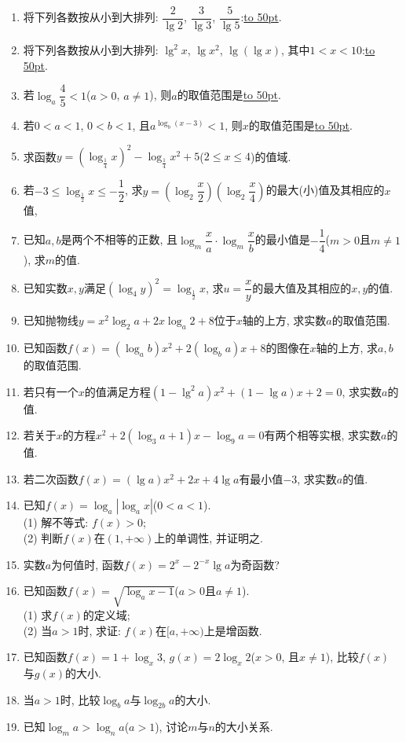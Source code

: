 \documentclass[10pt,a4paper]{article}
\newcommand{\blank}[1]{\underline{\hbox to #1pt{}}}
\begin{document}
\begin{enumerate}[1.]
\item 将下列各数按从小到大排列: $\dfrac 2{\lg 2}$, $\dfrac 3{\lg 3}$, $\dfrac 5{\lg 5}$:\blank{50}.
\item 将下列各数按从小到大排列: $\lg ^2x$, $\lg x^2$, $\lg (\lg x)$, 其中$1<x<10$:\blank{50}.
\item 若$\log_a\dfrac 45<1$($a>0$, $a\ne 1$), 则$a$的取值范围是\blank{50}.
\item 若$0<a<1$, $0<b<1$, 且$a^{\log_b(x-3)}<1$, 则$x$的取值范围是\blank{50}.
\item 求函数$y=(\log_{\frac 14}x)^2-\log_{\frac 14}x^2+5$($2\le x\le 4$)的值域.
\item 若$-3\le \log_{\frac 12}x\le -\dfrac 12$, 求$y=(\log_2\dfrac x2)(\log_2\dfrac x4)$的最大(小)值及其相应的$x$值,
\item 已知$a,b$是两个不相等的正数, 且$\log_m\dfrac xa\cdot \log_m\dfrac xb$的最小值是$-\dfrac 14$($m>0$且$m\ne 1$), 求$m$的值.
\item 已知实数$x,y$满足$(\log_4y)^2=\log_{\frac 12}x$, 求$u=\dfrac xy$的最大值及其相应的$x,y$的值.
\item 已知抛物线$y=x^2\log_2a+2x\log_a2+8$位于$x$轴的上方, 求实数$a$的取值范围.
\item 已知函数$f(x)=(\log_ab)x^2+2(\log_ba)x+8$的图像在$x$轴的上方, 求$a,b$的取值范围.
\item 若只有一个$x$的值满足方程$(1-\lg ^2a)x^2+(1-\lg a)x+2=0$, 求实数$a$的值.
\item 若关于$x$的方程$x^2+2(\log_3a+1)x-\log_9a=0$有两个相等实根, 求实数$a$的值.
\item 若二次函数$f(x)=(\lg a)x^2+2x+4\lg a$有最小值$-3$, 求实数$a$的值.
\item 已知$f(x)=\log_a|\log_ax|$($0<a<1$).\\
(1) 解不等式: $f(x)>0$;\\
(2) 判断$f(x)$在$(1,+\infty)$上的单调性, 并证明之.
\item 实数$a$为何值时, 函数$f(x)=2^x-2^{-x}\lg a$为奇函数?
\item 已知函数$f(x)=\sqrt {\log_ax-1}$($a>0$且$a\ne 1$).\\
(1) 求$f(x)$的定义域;\\
(2) 当$a>1$时, 求证: $f(x)$在$[a,+\infty)$上是增函数.
\item 已知函数$f(x)=1+\log_x3$, $g(x)=2\log_x2$($x>0$, 且$x\ne 1$), 比较$f(x)$与$g(x)$的大小.
\item 当$a>1$时, 比较$\log_ba$与$\log_{2b}a$的大小.
\item 已知$\log_ma>\log_na$($a>1$), 讨论$m$与$n$的大小关系.

\end{enumerate}
\end{document}
